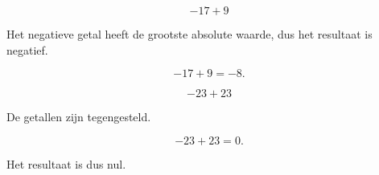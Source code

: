 \documentclass{ximera}
\begin{document}
\begin{oefening}{\oefU}
\begin{question}
\begin{oplossing}
\end{oplossing}

\end{question}


\begin{question}

\[
-17+9
\]

\begin{oplossing}

Het negatieve getal heeft de grootste absolute waarde, dus het resultaat is
negatief.

\[
-17+9=-8.
\]

\end{oplossing}

\end{question}


\begin{question}

\[
-23+23
\]

\begin{oplossing}

De getallen zijn tegengesteld.

\[
-23+23=0.
\]

Het resultaat is dus nul.

\end{oplossing}

\end{question}

\end{oefening}


\end{document}
